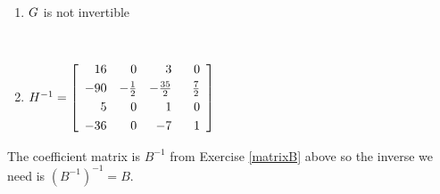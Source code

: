 \begin{multicols}{2} 
\begin{enumerate}
\setcounter{enumi}{\value{HW}}

\item $G \vphantom{\left[ \begin{array}{rrrr} 16 & 0 & 3 & 0 \\[3pt] -90 & -\frac{1}{2} & -\frac{35}{2} & \frac{7}{2} \\[3pt] 5 & 0 & 1 & 0 \\[3pt] -36 & 0 & -7 & \hphantom{-}1 \end{array} \right]}$ is not invertible
\item $H^{-1} = \left[ \begin{array}{rrrr} 16 & 0 & 3 & 0 \\[3pt] -90 & -\frac{1}{2} & -\frac{35}{2} & \frac{7}{2} \\[3pt] 5 & 0 & 1 & 0 \\[3pt] -36 & 0 & -7 & \hphantom{-}1 \end{array} \right]$

\setcounter{HW}{\value{enumi}}
\end{enumerate}
\end{multicols}

The coefficient matrix is $B^{-1}$ from Exercise \ref{matrixB} above so the inverse we need is $(B^{-1})^{-1} = B$. 

